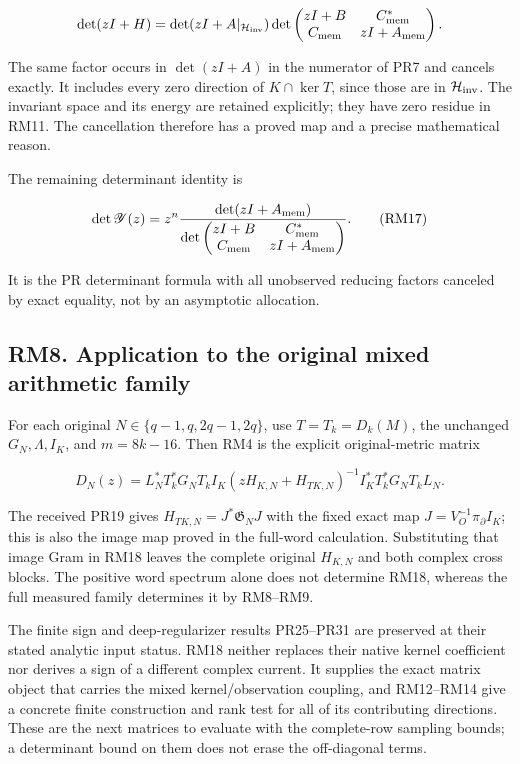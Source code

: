 \documentclass[11pt]{article}
\begin{document}
\[
 \det(zI+H)=\det(zI+A|_{\mathcal H_{\rm inv}})
 \det\begin{pmatrix}zI+B&C_{\rm mem}^*\\C_{\rm mem}&zI+A_{\rm mem}\end{pmatrix}.
\]

The same factor occurs in \(\det(zI+A)\) in the numerator of PR7 and cancels exactly. It includes every zero direction of \(K\cap\ker T\), since those are in \(\mathcal H_{\rm inv}\). The invariant space and its energy are retained explicitly; they have zero residue in RM11. The cancellation therefore has a proved map and a precise mathematical reason.

The remaining determinant identity is

\[
 \det\mathscr Y(z)=
 z^n\frac{\det(zI+A_{\rm mem})}
 {\det\begin{pmatrix}zI+B&C_{\rm mem}^*\\C_{\rm mem}&zI+A_{\rm mem}\end{pmatrix}}.
 \tag{RM17}
\]

It is the PR determinant formula with all unobserved reducing factors canceled by exact equality, not by an asymptotic allocation.

\subsection{RM8. Application to the original mixed arithmetic family}\label{rm8.-application-to-the-original-mixed-arithmetic-family}

For each original \(N\in\{q-1,q,2q-1,2q\}\), use \(T=T_k=D_k(M)\), the unchanged \(G_N,\Lambda,I_K\), and \(m=8k-16\). Then RM4 is the explicit original-metric matrix

\[
 D_N(z)=L_N^*T_k^*G_NT_kI_K
 (zH_{K,N}+H_{TK,N})^{-1}
 I_K^*T_k^*G_NT_kL_N.
 \tag{RM18}
\]

The received PR19 gives \(H_{TK,N}=J^*\mathfrak G_NJ\) with the fixed exact map \(J=V_O^{-1}\pi_\partial I_K\); this is also the image map proved in the full-word calculation. Substituting that image Gram in RM18 leaves the complete original \(H_{K,N}\) and both complex cross blocks. The positive word spectrum alone does not determine RM18, whereas the full measured family determines it by RM8--RM9.

The finite sign and deep-regularizer results PR25--PR31 are preserved at their stated analytic input status. RM18 neither replaces their native kernel coefficient nor derives a sign of a different complex current. It supplies the exact matrix object that carries the mixed kernel/observation coupling, and RM12--RM14 give a concrete finite construction and rank test for all of its contributing directions. These are the next matrices to evaluate with the complete-row sampling bounds; a determinant bound on them does not erase the off-diagonal terms.
\end{document}
